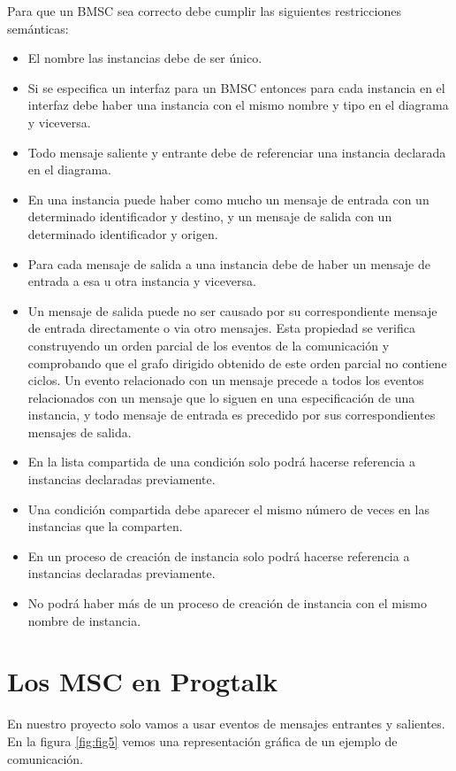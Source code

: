 
Para que un BMSC sea correcto debe cumplir las siguientes
restricciones semánticas:
\begin{itemize}
\item El nombre las instancias debe de ser único.
\item Si se especifica un interfaz para un BMSC entonces para cada
instancia en el interfaz debe haber una instancia con el mismo 
nombre y tipo en el diagrama y viceversa.
\item Todo mensaje saliente y entrante debe de referenciar una
instancia declarada en el diagrama.
\item En una instancia puede haber como mucho un mensaje de entrada
con un determinado identificador y destino, y un mensaje de salida con
un determinado identificador y origen.
\item Para cada mensaje de salida a una instancia debe de haber un 
mensaje de entrada a esa u otra instancia y viceversa.
\item Un mensaje de salida puede no ser causado por su correspondiente
mensaje de entrada directamente o via otro mensajes.     
Esta propiedad se verifica construyendo un orden parcial de los 
eventos de la comunicación y comprobando que el grafo dirigido 
obtenido de este orden parcial no contiene ciclos. Un evento
relacionado con un mensaje precede a todos los eventos relacionados
con un mensaje que lo siguen en una especificación de una instancia,
y todo mensaje de entrada es precedido por sus correspondientes 
mensajes de salida.
\item En la lista compartida de una condición solo podrá hacerse
referencia a instancias declaradas previamente.
\item Una condición compartida debe aparecer el mismo número de
veces en las instancias que la comparten.
\item En un proceso de creación de instancia solo podrá hacerse
referencia a instancias declaradas previamente.
\item No podrá haber más de un proceso de creación de instancia con
el mismo nombre de instancia.
\end{itemize}

\section{Los MSC en Progtalk}
En nuestro proyecto solo vamos a usar eventos de mensajes entrantes y
salientes. En la figura \ref{fig:fig5} vemos una representación
gráfica de un ejemplo de comunicación.

